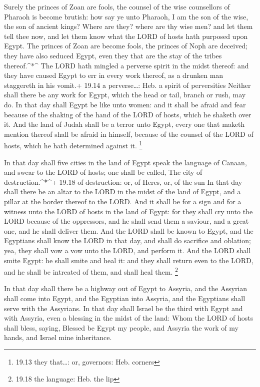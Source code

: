  Surely the princes of Zoan are fools, the counsel of the
wise counsellors of Pharaoh is become brutish: how say ye unto Pharaoh,
I am the son of the wise, the son of ancient kings?  Where
are they? where are thy wise men? and let them tell thee now, and let
them know what the LORD of hosts hath purposed upon Egypt. 
The princes of Zoan are become fools, the princes of Noph are deceived;
they have also seduced Egypt, even they that are the stay of the tribes
thereof.\^{}*\^{}  The LORD hath mingled a perverse spirit
in the midst thereof: and they have caused Egypt to err in every work
thereof, as a drunken man staggereth in his vomit.+ 19.14 a
perverse\ldots: Heb. a spirit of perversities  Neither
shall there be any work for Egypt, which the head or tail, branch or
rush, may do.  In that day shall Egypt be like unto women:
and it shall be afraid and fear because of the shaking of the hand of
the LORD of hosts, which he shaketh over it.  And the land
of Judah shall be a terror unto Egypt, every one that maketh mention
thereof shall be afraid in himself, because of the counsel of the LORD
of hosts, which he hath determined against it. \footnote{19.13 they
  that\ldots: or, governors: Heb. corners}

 In that day shall five cities in the land of Egypt speak
the language of Canaan, and swear to the LORD of hosts; one shall be
called, The city of destruction.\^{}*\^{}+ 19.18 of destruction: or, of
Heres, or, of the sun  In that day shall there be an altar
to the LORD in the midst of the land of Egypt, and a pillar at the
border thereof to the LORD.  And it shall be for a sign and
for a witness unto the LORD of hosts in the land of Egypt: for they
shall cry unto the LORD because of the oppressors, and he shall send
them a saviour, and a great one, and he shall deliver them.
 And the LORD shall be known to Egypt, and the Egyptians
shall know the LORD in that day, and shall do sacrifice and oblation;
yea, they shall vow a vow unto the LORD, and perform it. 
And the LORD shall smite Egypt: he shall smite and heal it: and they
shall return even to the LORD, and he shall be intreated of them, and
shall heal them. \footnote{19.18 the language: Heb. the lip}

 In that day shall there be a highway out of Egypt to
Assyria, and the Assyrian shall come into Egypt, and the Egyptian into
Assyria, and the Egyptians shall serve with the Assyrians. 
In that day shall Israel be the third with Egypt and with Assyria, even
a blessing in the midst of the land:  Whom the LORD of
hosts shall bless, saying, Blessed be Egypt my people, and Assyria the
work of my hands, and Israel mine inheritance.

